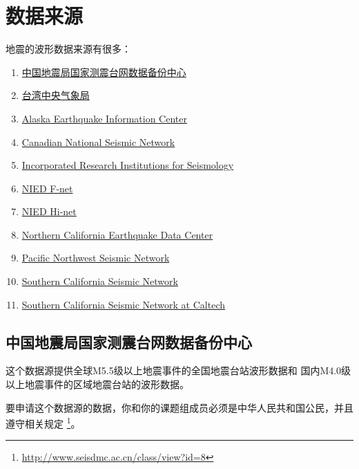 \section{数据来源}
地震的波形数据来源有很多：
\begin{enumerate}
\item \href{http://www.seisdmc.ac.cn/}{中国地震局国家测震台网数据备份中心}
\item \href{http://e-service.cwb.gov.tw/wdps/}{台湾中央气象局}
\item 
\href{http://www.aeic.alaska.edu/}{Alaska Earthquake Information Center}
\item 
\href{http://www.earthquakescanada.nrcan.gc.ca/stndon/CNSN-RNSC/index-eng.php}
{Canadian National Seismic Network}
\item 
\href{http://www.iris.edu/hq/}
{Incorporated Research Institutions for Seismology}
\item \href{http://www.fnet.bosai.go.jp/}{NIED F-net}
\item \href{http://www.hinet.bosai.go.jp/}{NIED Hi-net}
\item 
\href{http://www.ncedc.org/}{Northern California Earthquake Data Center}
\item \href{http://pnsn.org/}{Pacific Northwest Seismic Network}
\item \href{http://www.scsn.org/}{Southern California Seismic Network}
\item 
\href{http://scedc.caltech.edu/}
{Southern California Seismic Network at Caltech}
\end{enumerate}
\subsection{中国地震局国家测震台网数据备份中心}
这个数据源提供全球M5.5级以上地震事件的全国地震台站波形数据和
国内M4.0级以上地震事件的区域地震台站的波形数据。

要申请这个数据源的数据，你和你的课题组成员必须是中华人民共和国公民，并且遵守相关规定
\footnote{\url{http://www.seisdmc.ac.cn/class/view?id=8}}。
